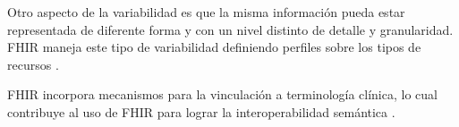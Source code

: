 Otro aspecto de la variabilidad es que la misma información pueda estar representada de diferente forma y con un nivel distinto de detalle y granularidad. FHIR maneja este tipo de variabilidad definiendo perfiles sobre los tipos de recursos \cite{FHIRDeveloper}.

FHIR incorpora mecanismos para la vinculación a terminología clínica, lo cual contribuye al uso de FHIR para lograr la interoperabilidad semántica \cite{FHIRArchitecture}.
